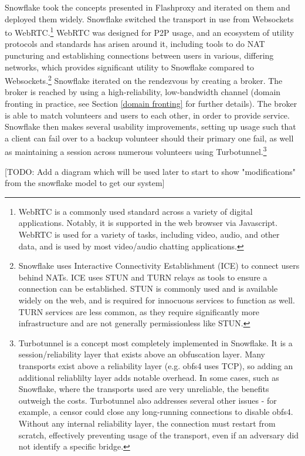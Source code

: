 \documentclass[12pt]{report}
\begin{document}
Snowflake took the concepts presented in Flashproxy and iterated on them and deployed them widely. Snowflake switched the transport in use from Websockets to WebRTC.\footnote{WebRTC is a commonly used standard across a variety of digital applications. Notably, it is supported in the web browser via Javascript. WebRTC is used for a variety of tasks, including video, audio, and other data, and is used by most video/audio chatting applications.} WebRTC was designed for P2P usage, and an ecosystem of utility protocols and standards has arisen around it, including tools to do NAT puncturing and establishing connections between users in various, differing networks, which provides significant utility to Snowflake compared to Websockets.\footnote{Snowflake uses Interactive Connectivity Establishment (ICE) to connect users behind NATs. ICE uses STUN and TURN relays as tools to ensure a connection can be established. STUN is commonly used and is available widely on the web, and is required for innocuous services to function as well. TURN services are less common, as they require significantly more infrastructure and are not generally permissionless like STUN.\cite{snowflake-tech}} Snowflake iterated on the rendezvous by creating a broker. The broker is reached by using a high-reliability, low-bandwidth channel (domain fronting in practice, see Section \ref{domain fronting} for further details). The broker is able to match volunteers and users to each other, in order to provide service. Snowflake then makes several usability improvements, setting up usage such that a client can fail over to a backup volunteer should their primary one fail, as well as maintaining a session across numerous volunteers using Turbotunnel.\footnote{Turbotunnel is a concept most completely implemented in Snowflake. It is a session/reliability layer that exists above an obfuscation layer.\cite{turbotunnel} Many transports exist above a reliability layer (e.g. obfs4 uses TCP), so adding an additional reliablilty layer adds notable overhead. In some cases, such as Snowflake, where the transports used are very unreliable, the benefits outweigh the costs. Turbotunnel also addresses several other issues - for example, a censor could close any long-running connections to disable obfs4.\cite{turbotunnel} Without any internal reliability layer, the connection must restart from scratch, effectively preventing usage of the transport, even if an adversary did not identify a specific bridge.}

[TODO: Add a diagram which will be used later to start to show "modifications" from the snowflake model to get our system]
\end{document}
